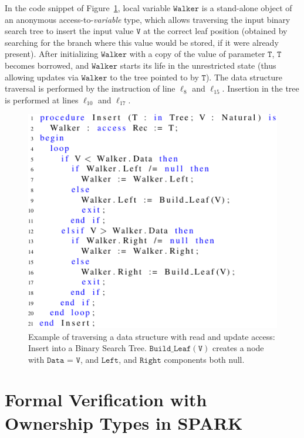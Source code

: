 \documentclass{llncs}
\newcommand\var[1]{\ensuremath{\mathtt{#1}}}
\begin{document}
In the code snippet of Figure~\ref{fig:treeInsert}, local variable \var{Walker} is a stand-alone object of an anonymous access-to-\textit{variable} type, which allows traversing the input binary
search tree to insert the input value \var{V} at the correct leaf position (obtained by searching for the branch where this value would be stored, if it were already present).
After initializing \var{Walker} with a copy of the value of parameter \var{T}, \var{T} becomes borrowed, and \var{Walker} starts its life in the unrestricted state (thus allowing updates via \var{Walker} to the tree pointed to by \var{T}).
The data structure traversal is performed by the instruction of line $\ell_8$ and $\ell_{15}$. Insertion in the tree is performed at lines
$\ell_{10}$ and $\ell_{17}$.


\begin{figure}[htb!]
\centering
  \captionsetup{justification=centering,margin=0.6cm}
   \includegraphics[]{treeInsert}
   \caption{Example of traversing a data structure with read and  update access: Insert into a Binary Search Tree. \var{Build\_Leaf(V)} creates a node with \var{Data} = \var{V}, and \var{Left}, and \var{Right} components both null.}
   \label{fig:treeInsert}
\end{figure}


\section{Formal Verification with Ownership Types in SPARK}
\label{sec:ownership-SPARK}
\end{document}
